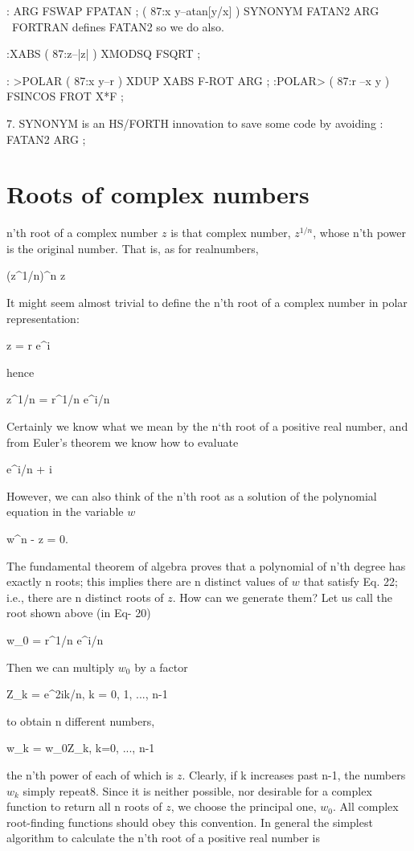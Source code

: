 : ARG FSWAP FPATAN ; ( 87:x y--atan[y/x] )
SYNONYM FATAN2 ARG
\ FORTRAN defines FATAN2 so we do also.

:XABS                ( 87:z--|z| )
    XMODSQ FSQRT ;

: >POLAR             ( 87:x y--r \theta[radians] )
    XDUP XABS F-ROT ARG ;
:POLAR>              ( 87:r \theta[radians]--x y )
    FSINCOS FROT X*F ;

7. SYNONYM is an HS/FORTH innovation to save some code by avoiding : FATAN2 ARG ;

\section{Roots of complex numbers}
 n'th root of a complex number $z$ is that complex number, $z^{1/n}$, whose n'th power is the original number. That is, as for realnumbers,

(z^{1/n})^n \equiv z

It might seem almost trivial to define the n’th root of a complex number in polar representation:

z = r e^{i\theta}

hence

z^{1/n} = r^{1/n} e^{i\theta/n}

Certainly we know what we mean by the n‘th root of a positive real number, and from Euler’s theorem we know how to evaluate

e^{i\theta/n} \equiv \cos{} + i \sin{}

However, we can also think of the n'th root as a solution of the polynomial equation in the variable $w$

w^n - z = 0.

The fundamental theorem of algebra proves that a polynomial of n'th degree has exactly n roots; this implies there are n distinct values of $w$ that satisfy Eq. 22; i.e., there are n distinct roots of $z$. How can we generate them? Let us call the root shown above (in Eq- 20)

w_0 = r^{1/n} e^{i\theta/n}

Then we can multiply $w_0$ by a factor

Z_k = e^{2\pi ik/n}, k = 0, 1, ..., n-1

to obtain n different numbers,

w_k = w_0Z_k, k=0, ..., n-1

the n’th power of each of which is $z$. Clearly, if k increases past n-1, the numbers $w_k$ simply repeat8. Since it is neither possible, nor desirable for a complex function to return all n roots of $z$, we choose the principal one, $w_0$. All complex root-finding functions should obey this convention. In general the simplest algorithm to calculate the n’th root of a positive real number is

